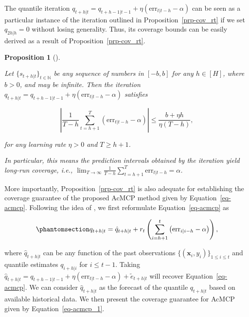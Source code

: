\documentclass[
  11pt,
  a4paper,
]{article}
\theoremstyle{plain}
\newtheorem{proposition}{Proposition}[section]
\theoremstyle{plain}
\theoremstyle{remark}
\begin{document}
The quantile iteration
\(q_{t+h|t}=q_{t+h-1|t-1}+\eta \left(\mathrm{err}_{t|t-h}-\alpha\right)\)
can be seen as a particular instance of the iteration outlined in
Proposition~\ref{prp-cov_rt} if we set \(q_{2h|h}=0\) without losing
generality. Thus, its coverage bounds can be easily derived as a result
of Proposition~\ref{prp-cov_rt}.

\begin{proposition}[]\protect\hypertarget{prp-cov_qt}{}\label{prp-cov_qt}

Let \(\{s_{t+h|t}\}_{t\in\mathbb{N}}\) be any sequence of numbers in
\([-b, b]\) for any \(h\in[H]\), where \(b>0\), and may be infinite.
Then the iteration
\(q_{t+h|t}=q_{t+h-1|t-1}+\eta \left(\mathrm{err}_{t|t-h}-\alpha\right)\)
satisfies

\[
\left|\frac{1}{T-h}\sum_{t=h+1}^{T}\left(\mathrm{err}_{t|t-h}-\alpha\right)\right| \leq \frac{b + \eta h}{\eta\left(T-h\right)},
\]

for any learning rate \(\eta > 0\) and \(T \geq h+1\).

In particular, this means the prediction intervals obtained by the
iteration yield long-run coverage, i.e.,
\(\lim _{T \rightarrow \infty} \frac{1}{T-h} \sum_{t=h+1}^T \mathrm{err}_{t|t-h} = \alpha\).

\end{proposition}

More importantly, Proposition~\ref{prp-cov_rt} is also adequate for
establishing the coverage guarantee of the proposed AcMCP method given
by Equation~\ref{eq-acmcp}. Following the idea of
\textcite{angelopoulos2024}, we first reformulate
Equation~\ref{eq-acmcp} as

\begin{equation}\phantomsection\label{eq-acmcp_1}{
q_{t+h|t}=\hat{q}_{t+h|t}+r_t\left(\sum_{i=h+1}^t \left(\mathrm{err}_{i|i-h}-\alpha\right)\right),
}\end{equation}

where \(\hat{q}_{t+h|t}\) can be any function of the past observations
\(\{(\bm{x}_i, y_i)\}_{1 \leq i \leq t}\) and quantile estimates
\(q_{i+h|i}\) for \(i \leq t-1\). Taking
\(\hat{q}_{t+h|t}=q_{t+h-1|t-1}+\eta \left(\mathrm{err}_{t|t-h}-\alpha\right)+\tilde{e}_{t+h|t}\)
will recover Equation~\ref{eq-acmcp}. We can consider
\(\hat{q}_{t+h|t}\) as the forecast of the quantile \(q_{t+h|t}\) based
on available historical data. We then present the coverage guarantee for
AcMCP given by Equation~\ref{eq-acmcp_1}.
\end{document}
